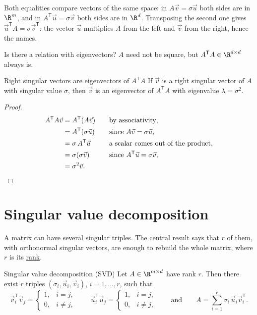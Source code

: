 \documentclass[a4paper,12pt,oneside]{report}
\begin{document}
Both equalities compare vectors of the same space: in
$A\vec v=\sigma\vec u$ both sides are in $\R^m$, and in
$A^{\mathsf T}\vec u=\sigma\vec v$ both sides are in $\R^d$.
Transposing the second one gives
$\vec u^{\mathsf T}A=\sigma\vec v^{\mathsf T}$: the vector $\vec u$
multiplies $A$ from the left and $\vec v$ from the right, hence the
names.

Is there a relation with eigenvectors? $A$ need not be square, but
$A^{\mathsf T}A\in\R^{d\times d}$ always is.

\begin{framedprop}{Right singular vectors are eigenvectors of $A^{\mathsf T}A$}
\label{prop:singular-eigen}
If $\vec v$ is a right singular vector of $A$ with singular value
$\sigma$, then $\vec v$ is an eigenvector of $A^{\mathsf T}A$ with
eigenvalue $\lambda=\sigma^2$.
\end{framedprop}

\begin{proof}
\[
\begin{aligned}
  A^{\mathsf T}A\vec v
    &=A^{\mathsf T}(A\vec v)
      &&\quad\text{by associativity},\\
    &=A^{\mathsf T}(\sigma\vec u)
      &&\quad\text{since } A\vec v=\sigma\vec u,\\
    &=\sigma\,A^{\mathsf T}\vec u
      &&\quad\text{a scalar comes out of the product},\\
    &=\sigma(\sigma\vec v)
      &&\quad\text{since } A^{\mathsf T}\vec u=\sigma\vec v,\\
    &=\sigma^2\vec v . &&\qedhere
\end{aligned}
\]
\end{proof}

\section{Singular value decomposition}
\label{sec:svd}

A matrix can have several singular triples. The central result says
that $r$ of them, with orthonormal singular vectors, are enough to
rebuild the whole matrix, where $r$ is its
\hyperref[def:matrix-rank]{rank}.

\begin{framedthm}{Singular value decomposition (SVD)}
\label{thm:svd}
Let $A\in\R^{m\times d}$ have rank $r$. Then there exist $r$ triples
$(\sigma_i,\vec u_i,\vec v_i)$, $i=1,\ldots,r$, such that
\[
  \vec v_i^{\mathsf T}\vec v_j=
  \begin{cases}1,&i=j,\\0,&i\neq j,\end{cases}
  \qquad
  \vec u_i^{\mathsf T}\vec u_j=
  \begin{cases}1,&i=j,\\0,&i\neq j,\end{cases}
  \qquad\text{and}\qquad
  A=\sum_{i=1}^{r}\sigma_i\,\vec u_i\vec v_i^{\mathsf T}.
\]
\end{framedthm}
\end{document}
